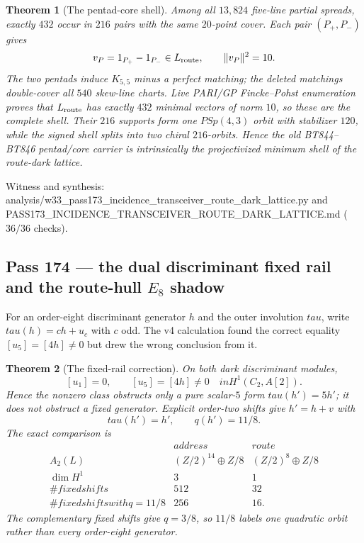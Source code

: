 \documentclass[12pt,a4paper]{article}
\def\mathbb#1{#1}%
\def\mathrm#1{#1}%
\def\mathbf#1{#1}%
\def\texttt#1{#1}%
\def\text#1{#1}%
\def\tau{tau}%
\newtheorem{theorem}{Theorem}[section]
\theoremstyle{definition}
\newcommand{\PSp}{\mathrm{PSp}}
\begin{document}
\begin{theorem}[The pentad-core shell]
\label{thm:pass173-pentads}
Among all $13{,}824$ five-line partial spreads, exactly $432$ occur in
$216$ pairs with the same $20$-point cover.  Each pair $(P_+,P_-)$ gives
\[
 v_P=\mathbf1_{P_+}-\mathbf1_{P_-}\in L_{\rm route},
 \qquad \|v_P\|^2=10.
\]
The two pentads induce $K_{5,5}$ minus a perfect matching; the deleted
matchings double-cover all $540$ skew-line charts.  Live PARI/GP
Fincke--Pohst enumeration proves that $L_{\rm route}$ has exactly $432$
minimal vectors of norm $10$, so these are the complete shell.  Their
$216$ supports form one $\PSp(4,3)$ orbit with stabilizer $120$, while
the signed shell splits into two chiral $216$-orbits.  Hence the old
BT844--BT846 pentad/core carrier is intrinsically the projectivized
minimum shell of the route-dark lattice.
\end{theorem}

\noindent Witness and synthesis:
\texttt{analysis/w33\_pass173\_incidence\_transceiver\_route\_dark\_lattice.py}
and \texttt{PASS173\_INCIDENCE\_TRANSCEIVER\_ROUTE\_DARK\_LATTICE.md}
($36/36$ checks).

\subsection{Pass 174 --- the dual discriminant fixed rail and the
route-hull $E_8$ shadow}
\label{ssec:pass174}

For an order-eight discriminant generator $h$ and the outer involution
$\tau$, write $\tau(h)=c h+u_c$ with $c$ odd.  The v4 calculation found
the correct equality $[u_5]=[4h]\ne0$ but drew the wrong conclusion from
it.

\begin{theorem}[The fixed-rail correction]
\label{thm:pass174-fixed-rail}
On both dark discriminant modules,
\[
 [u_1]=0,
 \qquad [u_5]=[4h]\ne0
 \quad\text{in }H^1(C_2,A[2]).
\]
Hence the nonzero class obstructs only a pure scalar-$5$ form
$\tau(h')=5h'$; it does not obstruct a fixed generator.  Explicit
order-two shifts give $h'=h+v$ with
\[
 \tau(h')=h',\qquad q(h')=11/8.
\]
The exact comparison is
\[
\begin{array}{c|cc}
 &\text{address}&\text{route}\\ \hline
A_2(L)&(\mathbb Z/2)^{14}\oplus\mathbb Z/8
 &(\mathbb Z/2)^8\oplus\mathbb Z/8\\
\dim H^1&3&1\\
\#\text{ fixed shifts}&512&32\\
\#\text{ fixed shifts with }q=11/8&256&16.
\end{array}
\]
The complementary fixed shifts give $q=3/8$, so $11/8$ labels one
quadratic orbit rather than every order-eight generator.
\end{theorem}
\end{document}
